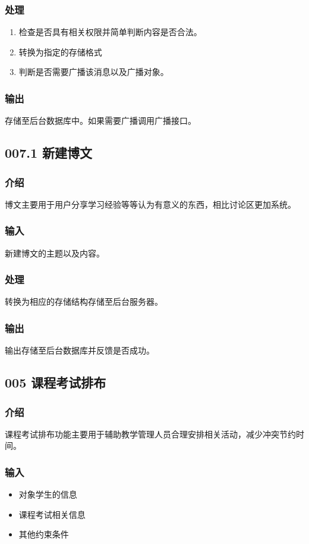     \subsubsection{处理}
    \begin{enumerate}
      \item 检查是否具有相关权限并简单判断内容是否合法。
      \item 转换为指定的存储格式
      \item 判断是否需要广播该消息以及广播对象。
    \end{enumerate}
    \subsubsection{输出}
    存储至后台数据库中。如果需要广播调用广播接口。

  \subsection{007.1 新建博文}
    \subsubsection{介绍}
    博文主要用于用户分享学习经验等等认为有意义的东西，相比讨论区更加系统。
    \subsubsection{输入}
    新建博文的主题以及内容。
    \subsubsection{处理}
    转换为相应的存储结构存储至后台服务器。
    \subsubsection{输出}
    输出存储至后台数据库并反馈是否成功。

  \subsection{005 课程考试排布}
    \subsubsection{介绍}
    课程考试排布功能主要用于辅助教学管理人员合理安排相关活动，减少冲突节约时间。
    \subsubsection{输入}
    \begin{itemize}
      \item 对象学生的信息
      \item 课程考试相关信息
      \item 其他约束条件
    \end{itemize}
